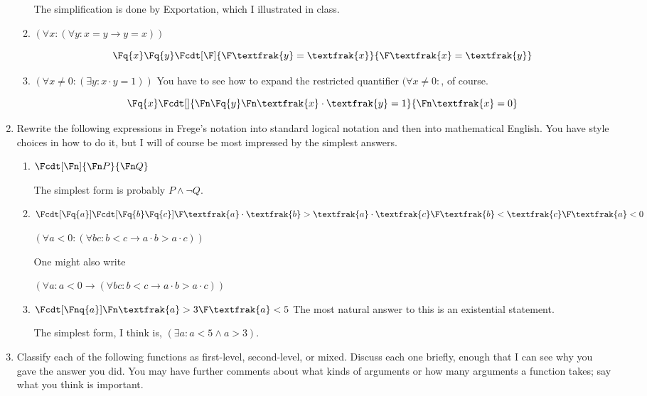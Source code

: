 \documentclass[12pt]{article}
\begin{document}
\begin{enumerate}
\begin{enumerate}
The simplification is done by Exportation, which I illustrated in class.

\item $(\forall x:(\forall y: {x} = y \rightarrow y = x))$

$$\Fq{x}\Fq{y}\Fcdt[\F]{\F \textfrak{y}=\textfrak{x}}{\F \textfrak{x}=\textfrak{y}}$$

\item $(\forall x \neq 0:(\exists y:x\cdot y = 1))$  You have to see how to expand the restricted quantifier $(\forall x \neq 0:$, of course.

$$\Fq{x} \Fcdt []{\Fn \Fq{y} \Fn \textfrak{x} \cdot \textfrak{y} = 1}{\Fn \textfrak{x}=0}$$


\end{enumerate}



\item Rewrite the following expressions in Frege's notation into standard logical notation and then into mathematical English.  You have style choices in how to do it, but I will of course be most impressed by the simplest answers.

\begin{enumerate}

\item  $\Fcdt[\Fn]{\Fn P}{\Fn Q}$

The simplest form is probably $P \wedge \neg Q$.

\item  $\Fcdt[\Fq{a}]{\Fcdt[\Fq{b}\Fq{c}]{\F \textfrak{a}\cdot \textfrak {b} > \textfrak{a} \cdot \textfrak{c}}{\F \textfrak{b} < \textfrak{c}}}{\F \textfrak{a} < 0}$

$(\forall a <0:(\forall bc: b<c \rightarrow a\cdot b >a\cdot c))$

One might also write

$(\forall a: a <0\rightarrow (\forall bc: b<c \rightarrow a\cdot b >a\cdot c))$

\item $\Fcdt[\Fnq{a}]{\Fn \textfrak{a} > 3}{\F \textfrak{a} <5}$  The most natural answer to this is an existential statement.

The simplest form, I think is, $(\exists a:a<5 \wedge a>3)$.

\end{enumerate}

\item  Classify each of the following functions as first-level, second-level, or mixed.  Discuss each one briefly, enough that I can see why you gave the answer you did.
You may have further comments about what kinds of arguments or how many arguments a function takes;  say what you think is important.


\end{enumerate}
\end{document}
